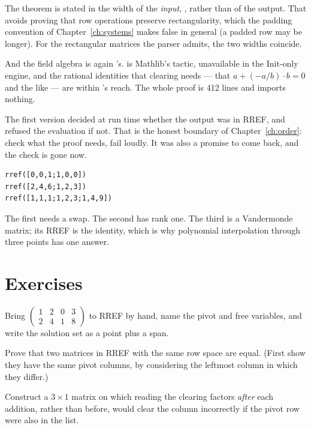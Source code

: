 The theorem is stated in the width of the \emph{input}, , rather than of the output.
That avoids proving that row operations preserve rectangularity, which the padding convention of
Chapter~\ref{ch:systems} makes false in general (a padded row may be longer). For the rectangular
matrices the parser admits, the two widths coincide.

And the field algebra is again 's.  is Mathlib's tactic, unavailable in the
Init-only engine, and the rational identities that clearing needs --- that $a + (-a/b)\cdot b = 0$
and the like --- are within 's reach. The whole proof is 412 lines and imports nothing.

\begin{logbox}
  The first version decided at run time whether the output was in RREF, and refused the
  evaluation if not. That is the honest boundary of Chapter~\ref{ch:order}: check what the
  proof needs, fail loudly. It was also a promise to come back, and the check is gone now.
\end{logbox}

\begin{trybox}
\begin{verbatim}
rref([0,0,1;1,0,0])
rref([2,4,6;1,2,3])
rref([1,1,1;1,2,3;1,4,9])
\end{verbatim}
  The first needs a swap. The second has rank one. The third is a Vandermonde matrix; its RREF
  is the identity, which is why polynomial interpolation through three points has one answer.
\end{trybox}

\section{Exercises}

\begin{exercisebox}
  Bring $\begin{pmatrix} 1 & 2 & 0 & 3 \\ 2 & 4 & 1 & 8 \end{pmatrix}$ to RREF by hand, name the
  pivot and free variables, and write the solution set as a point plus a span.
\end{exercisebox}

\begin{exercisebox}[Uniqueness]
  Prove that two matrices in RREF with the same row space are equal. (First show they have the
  same pivot columns, by considering the leftmost column in which they differ.)
\end{exercisebox}

\begin{exercisebox}
  Construct a $3 \times 1$ matrix on which reading the clearing factors \emph{after} each
  addition, rather than before, would clear the column incorrectly if the pivot row were also
  in the list.
\end{exercisebox}
